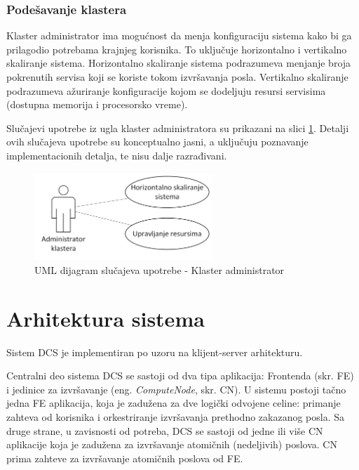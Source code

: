 \documentclass[12pt,oneside]{memoir}
\begin{document}
\subsubsection{Podešavanje klastera}
Klaster administrator ima mogućnost da menja konfiguraciju sistema kako bi ga prilagodio potrebama krajnjeg korisnika. To uključuje horizontalno i vertikalno skaliranje sistema. Horizontalno skaliranje sistema podrazumeva menjanje broja pokrenutih servisa koji se koriste tokom izvršavanja posla. Vertikalno skaliranje podrazumeva ažuriranje konfiguracije kojom se dodeljuju resursi servisima (dostupna memorija i procesorsko vreme).

Slučajevi upotrebe iz ugla klaster administratora su prikazani na slici \ref{fig:slucajupotrebe_admin_klastera}. Detalji ovih slučajeva upotrebe su konceptualno jasni, a uključuju poznavanje implementacionih detalja, te nisu dalje razrađivani.

\begin{figure}[!ht]
  \centering
  \includegraphics[width=0.6\textwidth]{./images/dijagram_slucajeva_upotrebe_administrator_klastera.png}
  \caption{UML dijagram slučajeva upotrebe - Klaster administrator}
  \label{fig:slucajupotrebe_admin_klastera}
\end{figure}

\section{Arhitektura sistema}

Sistem DCS je implementiran po uzoru na klijent-server arhitekturu.

Centralni deo sistema DCS se sastoji od dva tipa aplikacija: Frontenda (skr. FE) i jedinice za izvršavanje (eng. \emph{ComputeNode}, skr. CN). 
U sistemu postoji tačno jedna FE aplikacija, koja je zadužena za dve logički odvojene celine: primanje zahteva od korisnika i orkestriranje izvršavanja prethodno zakazanog posla.
Sa druge strane, u zavisnosti od potreba, DCS se sastoji od jedne ili više CN aplikacije koja je zadužena za izvršavanje atomičnih (nedeljivih) poslova. CN prima zahteve za izvršavanje atomičnih poslova od FE.
\end{document}

